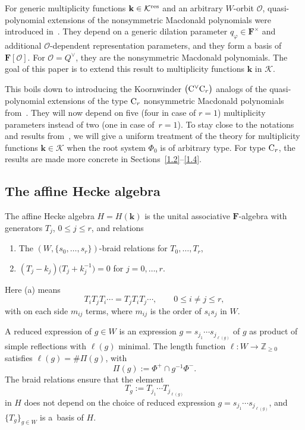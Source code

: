\documentclass[11pt]{article}
\numberwithin{equation}{section}
\numberwithin{equation}{section}
\begin{document}
For generic multiplicity functions $\mathbf{k}\in\mathcal{K}^{{\rm res}}$ and an arbitrary $W$-orbit $\mathcal{O}$, quasi-polynomial extensions of the nonsymmetric Macdonald polynomials were introduced in~\cite{SSV2}. They depend on a generic dilation parameter $q_\varphi\in\mathbf{F}^\times$ and additional $\mathcal{O}$-dependent representation parameters, and they form a basis of $\mathbf{F}[\mathcal{O}]$. For $\mathcal{O}=Q^\vee$, they are the nonsymmetric Macdonald polynomials.
The goal of this paper is to extend this result to multiplicity functions $\mathbf{k}$ in $\mathcal{K}$.

This boils down to introducing the Koornwinder $\bigl({\rm C}^\vee{\rm C}_r\bigr)$ analogs of the quasi-polynomial extensions of the type ${\rm C}_r$ nonsymmetric Macdonald polynomials from~\cite{SSV2}. They will now depend on five (four in case of $r=1$) multiplicity parameters instead of two (one in case of~${r=1}$). To stay close to the notations and results from~\cite{SSV2}, we will give a uniform treatment
of the theory for multiplicity functions $\mathbf{k}\in\mathcal{K}$ when the root system $\Phi_0$ is of arbitrary type. For type ${\rm C}_r$, the results are made more concrete in Sections~\ref{1.2}--\ref{1.4}.

\subsection{The affine Hecke algebra}\label{AHAsection}

The affine Hecke algebra $H=H(\mathbf{k})$ is the unital associative $\mathbf{F}$-algebra with generators $T_j$, $0\leq j\leq r$, and relations
\begin{enumerate}\itemsep=0pt\samepage
\item[(a)] The $(W,\{s_0,\dots,s_r\})$-braid relations for $T_0,\dots,T_r$,
\item[(b)] $(T_j-k_j)\bigl(T_j+k_j^{-1}\bigr)=0$ for $j=0,\dots,r$.
\end{enumerate}\pagebreak

\noindent
Here (a) means{\samepage
\[
T_iT_jT_i\cdots=T_jT_iT_j\cdots,\qquad 0\leq i\not=j\leq r,
\]
with on each side $m_{ij}$ terms, where $m_{ij}$ is the order of $s_is_j$ in $W$.}

A reduced expression of $g\in W$ is an expression $g=s_{j_1}\cdots s_{j_{\ell(g)}}$ of $g$ as product of simple reflections with $\ell(g)$ minimal.
The length function $\ell\colon W\rightarrow\mathbb{Z}_{\geq 0}$ satisfies $\ell(g)=\#\Pi(g)$, with
\[
\Pi(g):=\Phi^+\cap g^{-1}\Phi^-.
\]
The braid relations ensure that the element
\[
T_g:=T_{j_1}\cdots T_{j_{\ell(g)}}
\]
in $H$ does not depend on the choice of reduced expression $g=s_{j_1}\cdots s_{j_{\ell(g)}}$, and $\{T_g\}_{g\in W}$ is a~basis of $H$.
\end{document}
